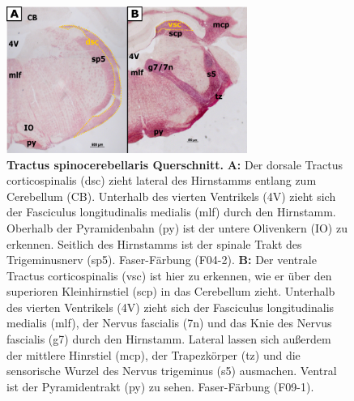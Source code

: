 \begin{figure}[H]
    \centering
    \includegraphics[width=0.7\textwidth]{pictures/Bilder_Laura/spinocerebellar_tract_F04_2P_025x_F09_1P_025x.png}
    \caption[Tractus spinocerebellaris Querschnitt]{\textbf{Tractus spinocerebellaris Querschnitt.} \textbf{A:} Der dorsale Tractus corticospinalis (dsc) zieht lateral des Hirnstamms entlang zum Cerebellum (CB). Unterhalb des vierten Ventrikels (4V) zieht sich der Fasciculus longitudinalis medialis (mlf) durch den Hirnstamm. Oberhalb der Pyramidenbahn (py) ist der untere Olivenkern (IO) zu erkennen. Seitlich des Hirnstamms ist der spinale Trakt des Trigeminusnerv (sp5). Faser-Färbung (F04-2). \textbf{B:} Der ventrale Tractus corticospinalis (vsc) ist hier zu erkennen, wie er über den superioren Kleinhirnstiel (scp) in das Cerebellum zieht.  Unterhalb des vierten Ventrikels (4V) zieht sich der Fasciculus longitudinalis medialis (mlf), der Nervus fascialis (7n) und das Knie des Nervus fascialis (g7) durch den Hirnstamm. Lateral lassen sich außerdem der mittlere Hinrstiel (mcp), der Trapezkörper (tz) und die sensorische Wurzel des Nervus trigeminus (s5) ausmachen. Ventral ist der Pyramidentrakt (py) zu sehen. Faser-Färbung (F09-1).}
    \label{fig:spinocerebellar}
\end{figure}
